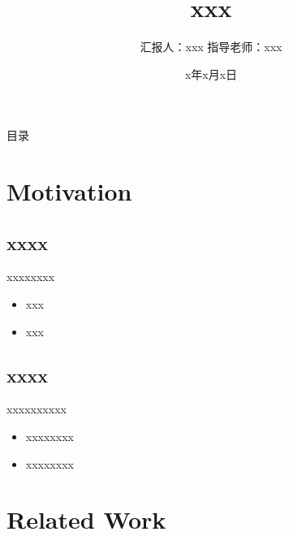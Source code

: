 \documentclass{ctexbeamer}
\title[xxx]{xxx}
\author{汇报人：xxx \newline  指导老师：xxx}
\institute{xxx}
\date{x年x月x日}
\begin{document}
\begin{frame}
  \titlepage
\end{frame}


\begin{frame}{目录}

    \tableofcontents     %
  
\end{frame}

\AtBeginSection[]{
	\begin{frame}
		\tableofcontents[currentsection]
	\end{frame}
} %



\graphicspath{{figures/}}

\section{Motivation}
\subsection{xxxx}

    \begin{frame}{xxxx}{xxxx}
        \begin{itemize}
        \item
        xxx
        \item
        xxx
        \end{itemize}
    \end{frame}



\subsection{xxxx}
    \begin{frame}{xxxxx}{xxxxx}
        \begin{itemize}
        \item
        xxxxxxxx
        \item
        xxxxxxxx
        \end{itemize}
    \end{frame}




\section{Related Work}
\end{document}
